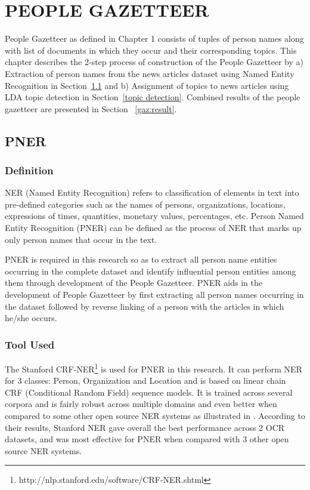 \chapter{PEOPLE GAZETTEER}
\label{chapter:people gazetteer}

People Gazetteer as defined in Chapter 1 consists of tuples of person names along with list of documents in which they occur and their corresponding topics. This chapter describes the 2-step process of construction of the People Gazetteer by
a) Extraction of person names from the news articles dataset using Named Entity Recognition in  Section~\ref{ner} and
b) Assignment of topics to news articles using LDA topic detection in  Section~\ref{topic detection}.
Combined results of the people gazetteer are presented in Section ~\ref{gaz:result}.

\section{PNER}
\label{ner}


\subsection{Definition}
NER (Named Entity Recognition) refers to classification of elements in text into pre-defined categories such as the names of persons, organizations, locations, expressions of times, quantities, monetary values, percentages, etc. 
Person Named Entity Recognition (PNER) can be defined as the process of NER that marks up only person names that occur in the text.

PNER is required in this research so as to extract all person name entities occurring in the complete dataset and identify influential person entities among them through development of the People Gazetteer. 
PNER aids in the development of People Gazetteer by first extracting all person names occurring in the dataset followed by reverse linking of a person with the articles in which he/she occurs.

\subsection{Tool Used}

The Stanford CRF-NER\footnote{http://nlp.stanford.edu/software/CRF-NER.shtml} is used for PNER in this research. It can perform NER for 3 classes: Person, Organization and Location and is based on linear chain CRF (Conditional Random Field) sequence models. It is trained across several corpora and is fairly robust across multiple domains and even better when compared to some other open source NER systems as illustrated in \cite{rodriquez2012comparison}. According to their results, Stanford NER gave overall the best performance across 2 OCR datasets, and was most effective for PNER when compared with 3 other open source NER systems.


